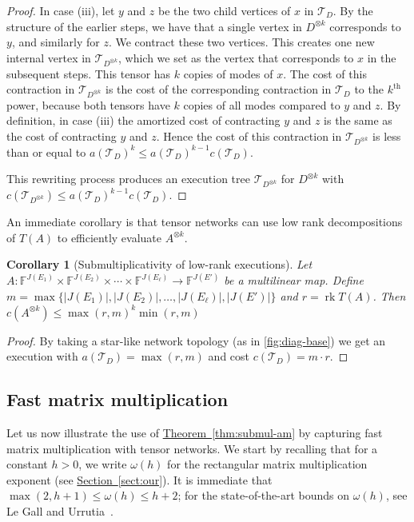 \documentclass[11pt]{article}
\numberwithin{equation}{section}
\newtheorem{corollary}[theorem]{Corollary}
\theoremstyle{definition}
\theoremstyle{plain}
\newcommand{\expref}[2]{\hyperref[#2]{#1~\ref{#2}}}
\newcommand{\rk}{\ensuremath{\operatorname{rk}}}
\newcommand{\F}{\ensuremath{\mathbb{F}}}
\newcommand{\td}{\ensuremath{\mathcal{T}_D}}
\newcommand{\tdk}{\ensuremath{\mathcal{T}_{D^{\otimes k}}}}
\begin{document}
\begin{proof}
In case (iii), let $y$ and $z$ be the two child vertices of $x$ in $\td$.
By the structure of the earlier steps, we have that a single vertex in
$D^{\otimes k}$ corresponds to $y$,
and similarly for $z$. We contract these two vertices. This creates one new
internal vertex in $\tdk$, which we set as the vertex that corresponds
to $x$ in the subsequent steps. This tensor has $k$ copies of modes of $x$. The cost of this contraction in $\tdk$ is the cost of the corresponding contraction in $\td$ to the $k^\text{th}$ power, because both tensors have $k$ copies of all modes compared to $y$ and $z$. By definition, in case (iii) the amortized cost of contracting $y$ and $z$ is the same as the cost of contracting $y$ and $z$. Hence the cost of this contraction in $\tdk$ is less than or equal to $a(\td)^k \leq a(\td)^{k-1} c(\td)$.

This rewriting process produces an execution tree $\tdk$
for $D^{\otimes k}$ with $c(\tdk)\leq a(\td)^{k-1} c(\td)$.
\end{proof}

An immediate corollary is that tensor networks can use low rank
decompositions of $T(A)$ to efficiently evaluate $A^{\otimes k}$.

\begin{corollary}[Submultiplicativity of low-rank executions]
  \label{cor:low rank execution}
  Let $A: \F^{J(E_1)} \times \F^{J(E_2)} \times \cdots \times
  \F^{J(E_\ell)} \rightarrow \F^{J(E')}$ be a multilinear map.  Define
  $m \!=\! \max\{|J(E_1)|, |J(E_2)|, \ldots, |J(E_\ell)|, |J(E')|\}$ and
  $r = \rk T(A)$.  Then $c(A^{\otimes k}) \le \max(r, m)^{k} \min(r, m)$
\end{corollary}

\begin{proof}
  By taking a star-like network topology (as in \eqref{fig:diag-base})
  we get an execution with $a(\td) = \max(r, m)$ and cost $c(\td) = m \cdot
  r$.
\end{proof}



\subsection{Fast matrix multiplication}
\label{sec:matrix mul upper bound}

Let us now illustrate the use of \expref{Theorem}{thm:submul-am} by capturing
fast matrix multiplication with tensor networks. We start by recalling that
for a constant $h>0$, we write $\omega(h)$ for the rectangular matrix
multiplication exponent
(see \expref{Section}{sect:our}). %
It is immediate that
$\max(2,h+1)\leq\omega(h)\leq h+2$; for the state-of-the-art bounds
on $\omega(h)$,
see Le Gall and Urrutia~\cite{LeGallU2017}. %
\end{document}
